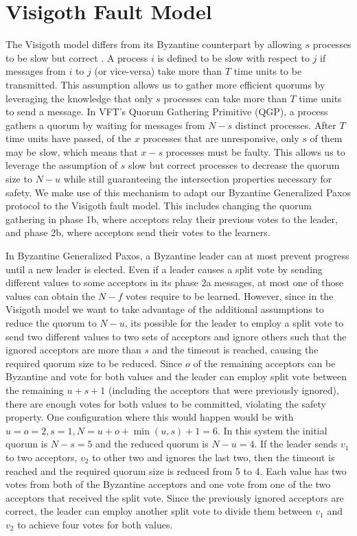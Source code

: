 \section{Visigoth Fault Model}

The Visigoth model differs from its Byzantine counterpart by allowing $s$ processes to be slow but correct \cite{}. A process $i$ is defined to be slow with respect to $j$ if messages from $i$ to $j$ (or vice-versa) take more than $T$ time units to be transmitted. This assumption allows us to gather more efficient quorums by leveraging the knowledge that only $s$ processes can take more than $T$ time units to send a message. In VFT's Quorum Gathering Primitive (QGP), a process gathers a quorum by waiting for messages from $N-s$ distinct processes. After $T$ time units have passed, of the $x$ processes that are unresponsive, only $s$ of them may be slow, which means that $x-s$ processes must be faulty. This allows us to leverage the assumption of $s$ slow but correct processes to decrease the quorum size to $N-u$ while still guaranteeing the intersection properties necessary for safety. We make use of this mechanism to adapt our Byzantine Generalized Paxos protocol to the Visigoth fault model. This includes changing the quorum gathering in phase 1b, where acceptors relay their previous votes to the leader, and phase 2b, where acceptors send their votes to the learners. \par
In Byzantine Generalized Paxos, a Byzantine leader can at most prevent progress until a new leader is elected. Even if a leader causes a split vote by sending different values to some acceptors in its phase 2a messages, at most one of those values can obtain the $N-f$ votes require to be learned. However, since in the Visigoth model we want to take advantage of the additional assumptions to reduce the quorum to $N-u$, its possible for the leader to employ a split vote to send two different values to two sets of acceptors and ignore others such that the ignored acceptors are more than $s$ and the timeout is reached, causing the required quorum size to be reduced. Since $o$ of the remaining acceptors can be Byzantine and vote for both values and the leader can employ split vote between the remaining $u+s+1$ (including the acceptors that were previously ignored), there are enough votes for both values to be committed, violating the safety property. One configuration where this would happen would be with $u=o=2, s=1, N=u+o+\min(u,s)+1=6$. In this system the initial quorum is $N-s=5$ and the reduced quorum is $N-u=4$. If the leader sends $v_1$ to two acceptors, $v_2$ to other two and ignores the last two, then the timeout is reached and the required quorum size is reduced from 5 to 4. Each value has two votes from both of the Byzantine acceptors and one vote from one of the two acceptors that received the split vote. Since the previously ignored acceptors are correct, the leader can employ another split vote to divide them between $v_1$ and $v_2$ to achieve four votes for both values. \par
